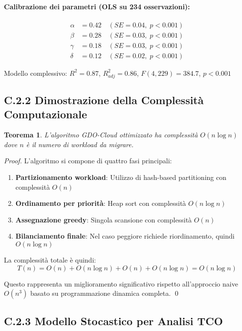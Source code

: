 \paragraph{Calibrazione dei parametri (OLS su 234 osservazioni):}
\begin{align}
\alpha &= 0.42 \quad (SE = 0.04, \; p < 0.001) \\
\beta &= 0.28 \quad (SE = 0.03, \; p < 0.001) \\
\gamma &= 0.18 \quad (SE = 0.03, \; p < 0.001) \\
\delta &= 0.12 \quad (SE = 0.02, \; p < 0.001)
\end{align}

Modello complessivo: $R^2 = 0.87$, $R^2_{adj} = 0.86$, $F(4,229) = 384.7$, $p < 0.001$

\subsection{C.2.2 Dimostrazione della Complessità Computazionale}

\newtheorem{theorem}{Teorema}
\begin{theorem}
L'algoritmo GDO-Cloud ottimizzato ha complessità $O(n \log n)$ dove $n$ è il numero di workload da migrare.
\end{theorem}

\begin{proof}
L'algoritmo si compone di quattro fasi principali:
\begin{enumerate}
    \item \textbf{Partizionamento workload}: Utilizzo di hash-based partitioning con complessità $O(n)$
    \item \textbf{Ordinamento per priorità}: Heap sort con complessità $O(n \log n)$
    \item \textbf{Assegnazione greedy}: Singola scansione con complessità $O(n)$
    \item \textbf{Bilanciamento finale}: Nel caso peggiore richiede riordinamento, quindi $O(n \log n)$
\end{enumerate}

La complessità totale è quindi:
$$T(n) = O(n) + O(n \log n) + O(n) + O(n \log n) = O(n \log n)$$

Questo rappresenta un miglioramento significativo rispetto all'approccio naive $O(n^3)$ basato su programmazione dinamica completa. \qed
\end{proof}

\subsection{C.2.3 Modello Stocastico per Analisi TCO}

